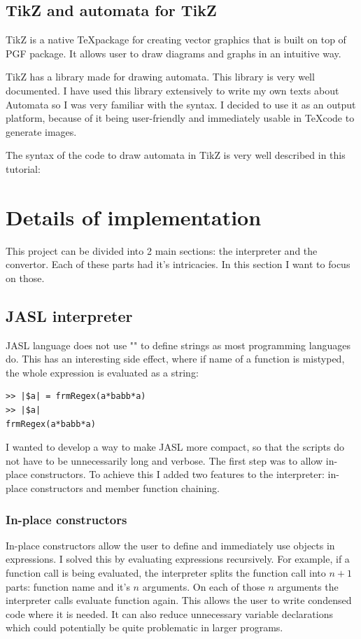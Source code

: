 \documentclass{ctuthesis}
\begin{document}
\subsection{TikZ and automata for TikZ}
TikZ is a native \TeX package for creating vector graphics that is built on top of PGF package. It allows user to draw diagrams and graphs in an intuitive way.

TikZ has a library made for drawing automata. This library is very well documented. I have used this library extensively to write my own texts about Automata so I was very familiar with the syntax. I decided to use it as an output platform, because of it being user-friendly and immediately usable in \TeX code to generate images.

The syntax of the code to draw automata in TikZ is very well described in this tutorial:~\cite{tikz-tut}

\section{Details of implementation}
This project can be divided into 2 main sections: the interpreter and the convertor. Each of these parts had it's intricacies. In this section I want to focus on those.

\subsection{JASL interpreter}
JASL language does not use "" to define strings as most programming languages do. This has an interesting side effect, where if name of a function is mistyped, the whole expression is evaluated as a string:

\begin{minipage}{\linewidth}
\begin{lstlisting}[language = JASL_snippet]
>> |$a| = frmRegex(a*babb*a)
>> |$a|
frmRegex(a*babb*a)
\end{lstlisting}
\end{minipage}

I wanted to develop a way to make JASL more compact, so that the scripts do not have to be unnecessarily long and verbose. The first step was to allow in-place constructors. To achieve this I added two features to the interpreter: in-place constructors and member function chaining.

\subsubsection{In-place constructors}
In-place constructors allow the user to define and immediately use objects in expressions. I solved this by evaluating expressions recursively. For example, if a function call is being evaluated, the interpreter splits the function call into $n+1$ parts: function name and it's $n$ arguments. On each of those $n$ arguments the interpreter calls evaluate function again. This allows the user to write condensed code where it is needed. It can also reduce unnecessary variable declarations which could potentially be quite problematic in larger programs.
\end{document}
